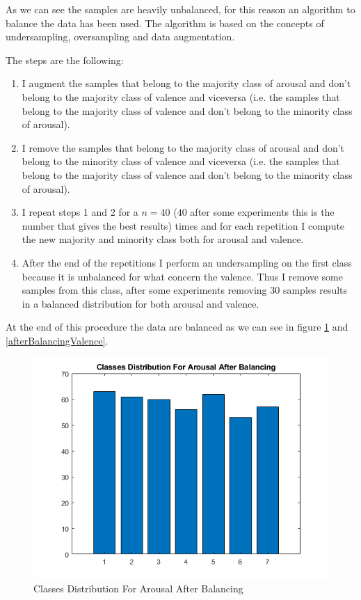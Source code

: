 \documentclass[a4paper]{report}
\begin{document}
\noindent As we can see the samples are heavily unbalanced, for this reason an algorithm to balance the data has been used. The algorithm is based on the concepts of undersampling, oversampling and data augmentation.

\noindent The steps are the following:
\begin{enumerate}
	\item I augment the samples that belong to the majority class of arousal 
	 and don't belong to the majority class of valence and viceversa (i.e. the samples that 
	 belong to the majority class of valence and don't belong to the minority
	 class of arousal).
	 
	 \item I remove the samples that belong to the majority class of 
	 arousal and don't belong to the minority class of valence and viceversa (i.e. the
	 samples that belong to the majority class of valence and don't belong to
	 the minority class of arousal).
	
	 \item I repeat steps 1 and 2 for a $n=40$ ($40$ after some experiments this is the number that gives the best results) times and for each repetition I compute the new majority and minority class both for arousal and valence.
	 
	 \item After the end of the repetitions I perform an undersampling on the first class because it is unbalanced for what concern the valence. Thus I remove some samples from this class, after some experiments removing $30$ samples results in a balanced distribution for both arousal and valence.
\end{enumerate}

\noindent At the end of this procedure the data are balanced as we can see in figure \ref{afterBalancingArousal} and \ref{afterBalancingValence}.

	\begin{figure}[htbp]
		\centering
		\includegraphics[scale=0.7]{img/afterBalancingArousal.png}
		\caption{Classes Distribution For Arousal After Balancing}
		\label{afterBalancingArousal}
	\end{figure}  
	
\end{document}
